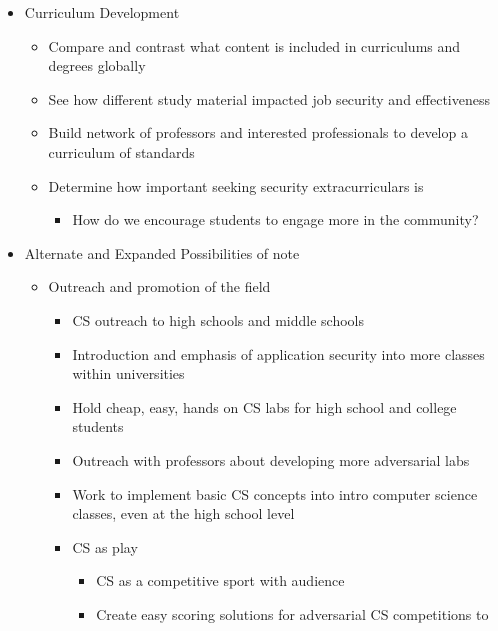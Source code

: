 \documentclass[openright]{report}
\begin{document}
\begin{appendices}
\begin{itemize}
    \item Curriculum Development
        \begin{itemize}
            \item Compare and contrast what content is included in curriculums and degrees globally
            \item See how different study material impacted job security and effectiveness
            \item Build network of professors and interested professionals to develop a curriculum of standards 
            \item Determine how important seeking security extracurriculars is
                \begin{itemize}
                    \item How do we encourage students to engage more in the community?
                \end{itemize}
        \end{itemize}
    \item Alternate and Expanded Possibilities of note
        \begin{itemize}
            \item Outreach and promotion of the field
                \begin{itemize}
                    \item CS outreach to high schools and middle schools
                    \item Introduction and emphasis of application security into more classes within universities
                    \item Hold cheap, easy, hands on CS labs for high school and college students
                    \item Outreach with professors about developing more adversarial labs
                    \item Work to implement basic CS concepts into intro computer science classes, even at the high school level
                    \item CS as play
                        \begin{itemize}
                            \item CS as a competitive sport with audience
                            \item Create easy scoring solutions for adversarial CS competitions to
                                \begin{adjustwidth}{2.5em}{0pt}
                                \begin{enumerate}

\end{enumerate}
\end{adjustwidth}
\end{itemize}
\end{itemize}
\end{itemize}
\end{itemize}
\end{appendices}
\end{document}
